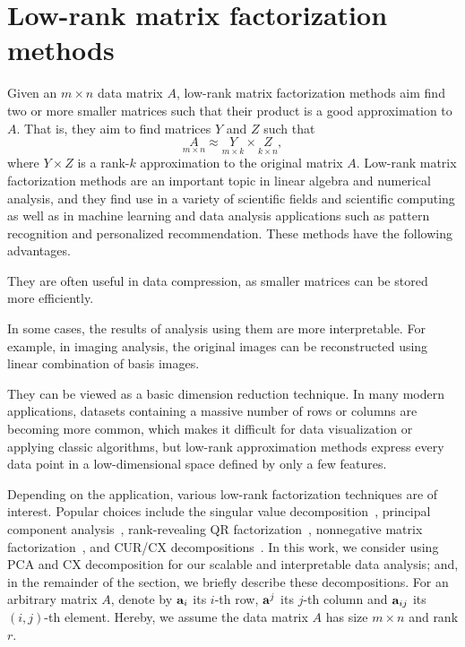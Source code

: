 \section{Low-rank matrix factorization methods}
\label{sxn:low-rank-methods}

Given an $m \times n$ data matrix $A$, low-rank matrix factorization methods aim find two or more smaller matrices such that their product is a good approximation to $A$.
That is, they aim to find matrices $Y$ and $Z$ such that
\begin{equation}
 \label{eqn:apprx}
    \underset{m\times n}{A} \approx \underset{m\times k}{Y} \times \underset{k\times n}{Z} , 
\end{equation}
where $Y \times Z$ is a rank-$k$ approximation to the original matrix $A$.
Low-rank matrix factorization methods are an important topic in linear algebra and numerical analysis, and they find use in a variety of scientific fields and scientific computing as well as in machine learning and data analysis applications such as pattern recognition and personalized recommendation.
These methods have the following advantages.
\begin{compactitem}
\item
They are often useful in data compression, as smaller matrices can be stored more efficiently.
\item
In some cases, the results of analysis using them are more interpretable.
For example, in imaging analysis, the original images can be reconstructed using linear combination of basis images.
\item
They can be viewed as a basic dimension reduction technique.
In many modern applications, datasets containing a massive number of rows or columns are becoming more common, which makes it difficult for data visualization or applying classic algorithms, but low-rank approximation methods express every data point in a low-dimensional space defined by only a few features.
\end{compactitem}

Depending on the application, various low-rank factorization techniques are of interest. 
Popular choices include the singular value decomposition~\cite{GVL96}, principal component analysis~\cite{pcaBook}, rank-revealing QR factorization~\cite{GE96}, nonnegative matrix factorization~\cite{NMFalg}, and CUR/CX decompositions~\cite{CUR_PNAS}.
In this work, we consider using PCA and CX decomposition for our scalable and interpretable data analysis; and, in the remainder of the section, we briefly describe these decompositions.
For an arbitrary matrix $A$, denote by $\mathbf{a}_i$ its $i$-th row, $\mathbf{a}^j$ its $j$-th column and $\mathbf{a}_{ij}$ its $(i,j)$-th element. 
Hereby, we assume the data matrix $A$ has size $m \times n$ and rank $r$.


